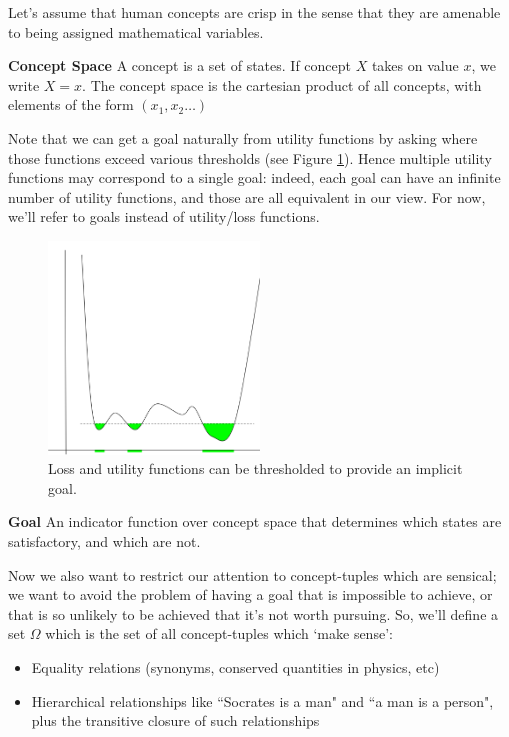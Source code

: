 \documentclass{article}
\begin{document}
Let's assume that human concepts are crisp in the sense that they are amenable to being assigned mathematical variables.

\begin{definition}{\textbf{Concept Space}}
    A concept is a set of states. If concept $X$ takes on value $x$, we write $X=x$.
    The concept space is the cartesian product of all concepts, with elements of the form $(x_1,x_2\dots)$
\end{definition}

Note that we can get a goal naturally from utility functions by asking where those functions exceed various thresholds (see Figure \ref{fig:loss-goal}). Hence multiple utility functions may correspond to a single goal: indeed, each goal can have an infinite number of utility functions, and those are all equivalent in our view. For now, we'll refer to goals instead of utility/loss functions.

\begin{figure}[ht]
    \centering
    \includegraphics[width=0.5\textwidth]{pics/loss-goal.png} 
    \caption{Loss and utility functions can be thresholded to provide an implicit goal.}
    \label{fig:loss-goal} 
\end{figure}

\begin{definition}{\textbf{Goal}}
    An indicator function over concept space that determines which states are satisfactory, and which are not.
\end{definition}


Now we also want to restrict our attention to concept-tuples which are sensical; we want to avoid the problem of having a goal that is impossible to achieve, or that is so unlikely to be achieved that it's not worth pursuing. So, we'll define a set $\Omega$ which is the set of all concept-tuples which `make sense':
\begin{itemize}
    \item Equality relations (synonyms, conserved quantities in physics, etc)
    \item Hierarchical relationships like ``Socrates is a man" and ``a man is a person", plus the transitive closure of such relationships
\end{itemize}
\end{document}
